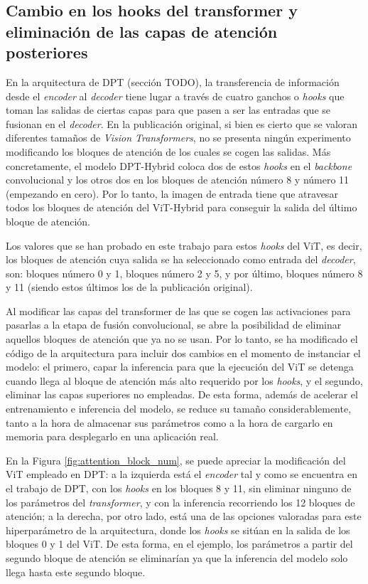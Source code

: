 \subsection{Cambio en los hooks del transformer y eliminación de las capas de atención posteriores}

En la arquitectura de DPT (sección TODO), la transferencia de información desde el \textit{encoder} al \textit{decoder} tiene lugar a través de cuatro ganchos o \textit{hooks} que toman las salidas de ciertas capas para que pasen a ser las entradas que se fusionan en el \textit{decoder}. En la publicación original, si bien es cierto que se valoran diferentes tamaños de \textit{Vision Transformers}, no se presenta ningún experimento modificando los bloques de atención de los cuales se cogen las salidas. Más concretamente, el modelo DPT-Hybrid coloca dos de estos \textit{hooks} en el \textit{backbone} convolucional y los otros dos en los bloques de atención número 8 y número 11 (empezando en cero). Por lo tanto, la imagen de entrada tiene que atravesar todos los bloques de atención del ViT-Hybrid para conseguir la salida del último bloque de atención.

Los valores que se han probado en este trabajo para estos \textit{hooks} del ViT, es decir, los bloques de atención cuya salida se ha seleccionado como entrada del \textit{decoder}, son: bloques número 0 y 1, bloques número 2 y 5, y por último, bloques número 8 y 11 (siendo estos últimos los de la publicación original).

Al modificar las capas del transformer de las que se cogen las activaciones para pasarlas a la etapa de fusión convolucional, se abre la posibilidad de eliminar aquellos bloques de atención que ya no se usan. Por lo tanto, se ha modificado el código de la arquitectura para incluir dos cambios en el momento de instanciar el modelo: el primero, capar la inferencia para que la ejecución del ViT se detenga cuando llega al bloque de atención más alto requerido por los \textit{hooks}, y el segundo, eliminar las capas superiores no empleadas. De esta forma, además de acelerar el entrenamiento e inferencia del modelo, se reduce su tamaño considerablemente, tanto a la hora de almacenar sus parámetros como a la hora de cargarlo en memoria para desplegarlo en una aplicación real. 

En la Figura \ref{fig:attention_block_num}, se puede apreciar la modificación del ViT empleado en DPT: a la izquierda está el \textit{encoder} tal y como se encuentra en el trabajo de DPT, con los \textit{hooks} en los bloques 8 y 11, sin eliminar ninguno de los parámetros del \textit{transformer}, y con la inferencia recorriendo los 12 bloques de atención; a la derecha, por otro lado, está una de las opciones valoradas para este hiperparámetro de la arquitectura, donde los \textit{hooks} se sitúan en la salida de los bloques 0 y 1 del ViT. De esta forma, en el ejemplo, los parámetros a partir del segundo bloque de atención se eliminarían ya que la inferencia del modelo solo llega hasta este segundo bloque.

